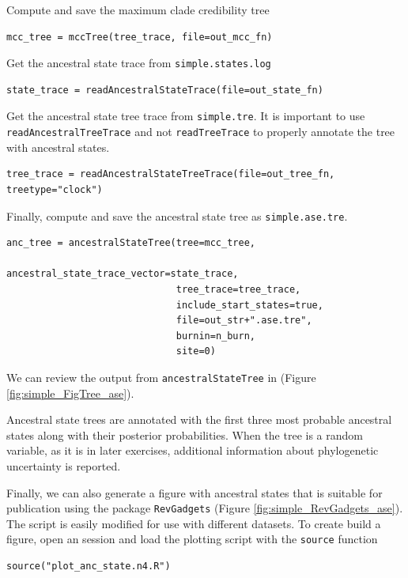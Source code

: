 Compute and save the maximum clade credibility tree
\begin{snugshade}
\begin{lstlisting}
mcc_tree = mccTree(tree_trace, file=out_mcc_fn)
\end{lstlisting}
\end{snugshade}

Get the ancestral state trace from {\tt simple.states.log}

\begin{snugshade}
\begin{lstlisting}
state_trace = readAncestralStateTrace(file=out_state_fn)
\end{lstlisting}
\end{snugshade}


Get the ancestral state tree trace from {\tt simple.tre}.
It is important to use {\tt readAncestralTreeTrace} and not {\tt readTreeTrace} to properly annotate the tree with ancestral states.

\begin{snugshade}
\begin{lstlisting}
tree_trace = readAncestralStateTreeTrace(file=out_tree_fn, treetype="clock")
\end{lstlisting}
\end{snugshade}

Finally, compute and save the ancestral state tree as {\tt simple.ase.tre}.

\begin{snugshade}
\begin{lstlisting}
anc_tree = ancestralStateTree(tree=mcc_tree,
                              ancestral_state_trace_vector=state_trace,
                              tree_trace=tree_trace,
                              include_start_states=true,
                              file=out_str+".ase.tre",
                              burnin=n_burn,
                              site=0)
\end{lstlisting}
\end{snugshade}

We can review the output from {\tt ancestralStateTree} in \FigTree (Figure \ref{fig:simple_FigTree_ase}).

Ancestral state trees are annotated with the first three most probable ancestral states along with their posterior probabilities.
When the tree is a random variable, as it is in later exercises, additional information about phylogenetic uncertainty is reported.

Finally, we can also generate a figure with ancestral states that is suitable for publication using the \R package {\tt RevGadgets} (Figure \ref{fig:simple_RevGadgets_ase}).
The script is easily modified for use with different datasets.
To create build a figure, open an \R session and load the plotting script with the {\tt source} function
\begin{snugshade}
\begin{lstlisting}
source("plot_anc_state.n4.R")
\end{lstlisting}
\end{snugshade}

